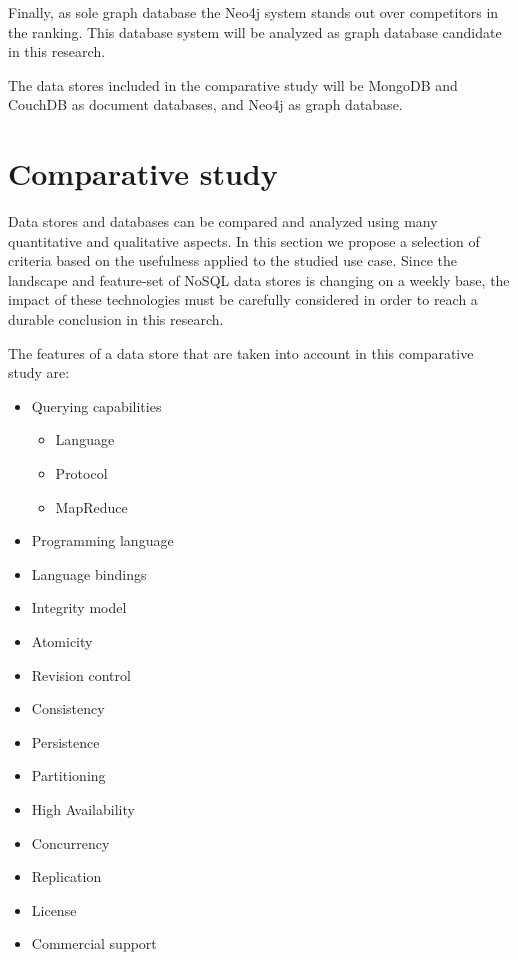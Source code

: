 Finally, as sole graph database the Neo4j system \autocite{Neo4j2007} stands out over competitors in the ranking.
This database system will be analyzed as graph database candidate in this research.

The data stores included in the comparative study will be MongoDB and CouchDB as document databases, and Neo4j as graph database.

\section{Comparative study}
\label{sec:comparative-study}

Data stores and databases can be compared and analyzed using many quantitative and qualitative aspects.
In this section we propose a selection of criteria based on the usefulness applied to the studied use case.
Since the landscape and feature-set of NoSQL data stores is changing on a weekly base, the impact of these technologies must be carefully considered in order to reach a durable conclusion in this research.

The features of a data store that are taken into account in this comparative study are:

\begin{itemize}
  \item Querying capabilities
    \begin{itemize}
      \item Language
      \item Protocol
      \item MapReduce
    \end{itemize}

  \item Programming language
  \item Language bindings

  \item Integrity model
  \item Atomicity
  \item Revision control
  \item Consistency

  \item Persistence
  \item Partitioning
  \item High Availability
  \item Concurrency
  \item Replication

  \item License
  \item Commercial support
\end{itemize}

